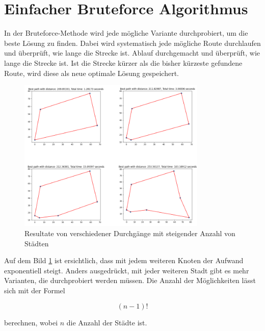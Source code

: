 %
%
%
%
\section{Einfacher Bruteforce Algorithmus
\label{buch:paper:varalg:section:bruteforce}}
In der Bruteforce-Methode wird jede mögliche Variante durchprobiert, 
um die beste Lösung zu finden. Dabei wird systematisch jede mögliche
Route durchlaufen und überprüft, wie lange die Strecke ist.  
Ablauf durchgemacht und überprüft, wie lange die Strecke ist.
Ist die Strecke kürzer als die bisher kürzeste gefundene Route, 
wird diese als neue optimale Lösung gespeichert.

\begin{figure}
    \centering
    \includegraphics[width=0.8\textwidth]{
        papers/varalg/images/teil2/02_bruteforce_methode.png
    }
    \caption{Resultate von verschiedener Durchgänge mit steigender Anzahl von Städten}
    \label{fig:results_bruteforce}
\end{figure}

Auf dem Bild \ref{fig:results_bruteforce} ist ersichtlich, dass mit 
jedem weiteren Knoten der Aufwand exponentiell steigt. Anders 
ausgedrückt, mit jeder weiteren Stadt gibt es mehr Varianten, die 
durchprobiert werden müssen. Die Anzahl der Möglichkeiten lässt sich 
mit der Formel

\begin{equation}
    (n-1)!
\end{equation}

berechnen, wobei \(n\) die Anzahl der Städte ist.

